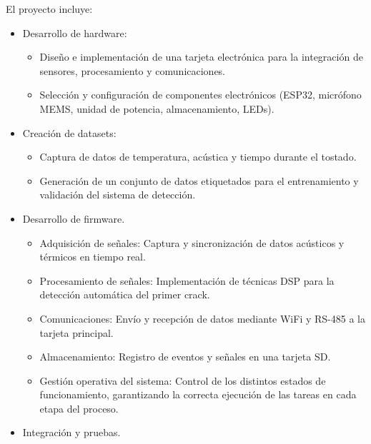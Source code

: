 \documentclass[
11pt, %
]{charter}
\begin{document}
El proyecto incluye:
\begin{itemize}
	\item Desarrollo de hardware:
		\begin{itemize}
			\item Diseño e implementación de una tarjeta electrónica para la integración de 					sensores, procesamiento y comunicaciones.
			
			\item Selección y configuración de componentes electrónicos (ESP32, micrófono MEMS, 				unidad de potencia, almacenamiento, LEDs).
		\end{itemize}	
	
	\item Creación de datasets:
		\begin{itemize}
			\item Captura de datos de temperatura, acústica y tiempo durante el tostado.
			
			\item Generación de un conjunto de datos etiquetados para el entrenamiento y 						validación del sistema de detección.
		\end{itemize}	
	
	\item Desarrollo de firmware.
		\begin{itemize}
			\item Adquisición de señales: Captura y sincronización de datos acústicos y térmicos 				en tiempo real.
			
			\item Procesamiento de señales: Implementación de técnicas DSP para la detección 					automática del primer crack.
			
			\item Comunicaciones: Envío y recepción de datos mediante WiFi y RS-485 a la tarjeta 				principal.
			
			\item Almacenamiento: Registro de eventos y señales en una tarjeta SD.
			
			\item Gestión operativa del sistema: Control de los distintos estados de 							funcionamiento, garantizando la correcta ejecución de las tareas en cada etapa del 				proceso.
		\end{itemize}
	
	\item Integración y pruebas.
	
\end{itemize}
\end{document}

